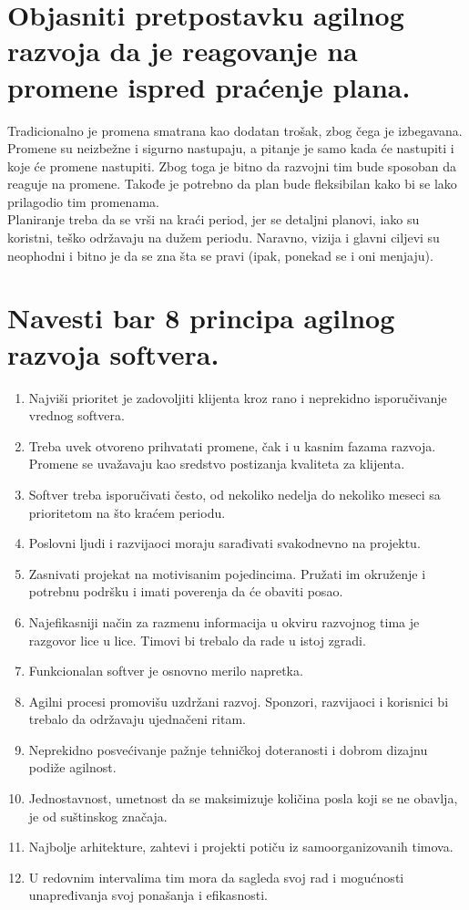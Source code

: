 \documentclass[a4paper]{article}
\begin{document}
\section{Objasniti pretpostavku agilnog razvoja da je reagovanje na promene ispred praćenje plana.}
  Tradicionalno je promena smatrana kao dodatan trošak, zbog čega je izbegavana. Promene su 
  neizbežne i sigurno nastupaju, a pitanje je samo kada će nastupiti i koje će promene nastupiti.
  Zbog toga je bitno da razvojni tim bude sposoban da reaguje na promene. Takođe je potrebno da plan
  bude fleksibilan kako bi se lako prilagodio tim promenama. \\
  \indent Planiranje treba da se vrši na kraći
  period, jer se detaljni planovi, iako su koristni, teško održavaju na dužem periodu. Naravno,
  vizija i glavni ciljevi su neophodni i bitno je da se zna šta se pravi (ipak, 
  ponekad se i oni menjaju).

\section{Navesti bar 8 principa agilnog razvoja softvera.}
  \begin{enumerate}
    \item Najviši prioritet je zadovoljiti klijenta kroz rano i neprekidno isporučivanje vrednog 
          softvera.
    \item Treba uvek otvoreno prihvatati promene, čak i u kasnim fazama razvoja. Promene se uvažavaju 
          kao sredstvo postizanja kvaliteta za klijenta.
    \item Softver treba isporučivati često, od nekoliko nedelja do nekoliko meseci sa prioritetom 
          na što kraćem periodu.
    \item Poslovni ljudi i razvijaoci moraju sarađivati svakodnevno na projektu.
    \item Zasnivati projekat na motivisanim pojedincima. Pružati im okruženje i potrebnu podršku
          i imati poverenja da će obaviti posao.
    \item Najefikasniji način za razmenu informacija u okviru razvojnog tima je razgovor
          lice u lice. Timovi bi trebalo da rade u istoj zgradi.
    \item Funkcionalan softver je osnovno merilo napretka.
    \item Agilni procesi promovišu uzdržani razvoj. Sponzori, razvijaoci i korisnici bi trebalo
          da održavaju ujednačeni ritam. 
    \item Neprekidno posvećivanje pažnje tehničkoj doteranosti i dobrom dizajnu podiže agilnost.  
    \item Jednostavnost, umetnost da se maksimizuje količina posla koji se ne obavlja, je od
          suštinskog značaja.
    \item Najbolje arhitekture, zahtevi i projekti potiču iz samoorganizovanih timova. 
    \item U redovnim intervalima tim mora da sagleda svoj rad i mogućnosti unapređivanja svoj ponašanja
          i efikasnosti. \cite{ss_agile_manifesto}
  \end{enumerate}
\end{document}
